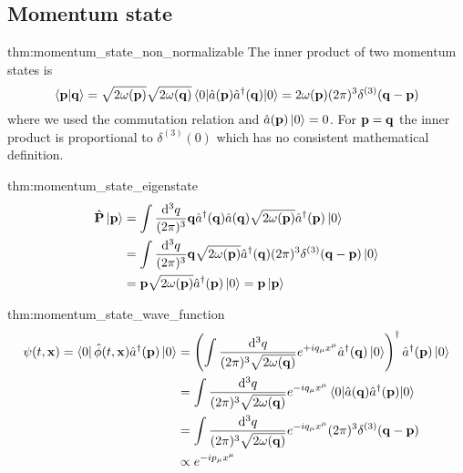 \subsection{Momentum state}

\begin{delayedproof}{thm:momentum_state_non_normalizable}
	The inner product of two momentum states is
	\begin{equation}
		\braket{\vb{p}}{\vb{q}}
		=
		\sqrt{2\omega(\vb{p})}
		\sqrt{2\omega(\vb{q})}
		\expval{\hat{a}(\vb{p})\hat{a}^\dagger(\vb{q})}{0}
		=
		2\omega(\vb{p})
		(2\pi)^3
		\delta^{(3)}(\vb{q}-\vb{p})
	\end{equation}
	where we used the commutation relation and $\hat{a}(\vb{p})\ket{0}=0$.
	For $\vb{p}=\vb{q}$ the inner product is proportional to $\delta^{(3)}(0)$ which has no consistent mathematical definition.
\end{delayedproof}
\begin{delayedproof}{thm:momentum_state_eigenstate}
	\begin{equation*}
		\begin{split}
			\hat{\vb{P}}
			\ket{\vb{p}}
			&=
			\int\frac{\dd[3]{q}}{(2\pi)^3}
			\vb{q}
			\hat{a}^\dagger(\vb{q})
			\hat{a}(\vb{q})
			\sqrt{2\omega(\vb{p})}
			\hat{a}^\dagger(\vb{p})
			\ket{0}
			\\
			&=
			\int\frac{\dd[3]{q}}{(2\pi)^3}
			\vb{q}
			\sqrt{2\omega(\vb{p})}
			\hat{a}^\dagger(\vb{q})
			(2\pi)^3
			\delta^{(3)}(\vb{q}-\vb{p})
			\ket{0}
			\\
			&=
			\vb{p}
			\sqrt{2\omega(\vb{p})}
			\hat{a}^\dagger(\vb{p})
			\ket{0}
			=
			\vb{p}
			\ket{\vb{p}}
		\end{split}
	\end{equation*}
\end{delayedproof}
\begin{delayedproof}{thm:momentum_state_wave_function}
	\begin{equation}
		\begin{split}
			\psi(t,\vb{x})
			=
			\bra{0}
			\hat\phi(t,\vb{x})
			\hat{a}^\dagger(\vb{p})
			\ket{0}
			&=
			\left(
				\int\frac{\dd[3]{q}}{(2\pi)^3\sqrt{2\omega(\vb{q})}}
				e^{+iq_\mu x^\mu}
				\hat{a}^\dagger(\vb{q})
				\ket{0}
			\right)^\dagger
			\hat{a}^\dagger(\vb{p})
			\ket{0}
			\\
			&=
			\int\frac{\dd[3]{q}}{(2\pi)^3\sqrt{2\omega(\vb{q})}}
			e^{-iq_\mu x^\mu}
			\expval{\hat{a}(\vb{q})\hat{a}^\dagger(\vb{p})}{0}
			\\
			&=
			\int\frac{\dd[3]{q}}{(2\pi)^3\sqrt{2\omega(\vb{q})}}
			e^{-iq_\mu x^\mu}
			(2\pi)^3
			\delta^{(3)}(\vb{q}-\vb{p})
			\\
			&\propto
			e^{-ip_\mu x^\mu}
		\end{split}
	\end{equation}
\end{delayedproof}


